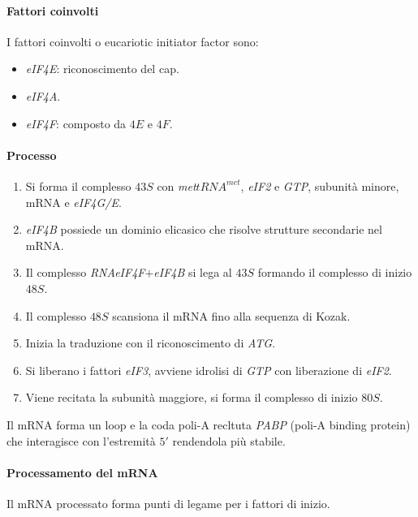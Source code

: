 			\paragraph{Fattori coinvolti}
			I fattori coinvolti o eucariotic initiator factor sono:
			\begin{multicols}{3}
				\begin{itemize}
					\item \emph{eIF4E}: riconoscimento del cap.
					\item \emph{eIF4A}.
					\item \emph{eIF4F}: composto da $4E$ e $4F$.
				\end{itemize}
			\end{multicols}

			\paragraph{Processo}
			\begin{multicols}{2}
				\begin{enumerate}
					\item Si forma il complesso $43S$ con \emph{met$tRNA^{met}$}, \emph{eIF2} e \emph{GTP}, subunit\`a minore, mRNA e \emph{eIF4G/E}.
					\item \emph{eIF4B} possiede un dominio elicasico che risolve strutture secondarie nel mRNA.
					\item Il complesso \emph{RNAeIF4F$+$eIF4B} si lega al $43S$ formando il complesso di inizio $48S$.
					\item Il complesso $48S$ scansiona il mRNA fino alla sequenza di Kozak.
					\item Inizia la traduzione con il riconoscimento di \emph{ATG}.
					\item Si liberano i fattori \emph{eIF3}, avviene idrolisi di \emph{GTP} con liberazione di \emph{eIF2}.
					\item Viene recitata la subunit\`a maggiore, si forma il complesso di inizio $80S$.
				\end{enumerate}
			\end{multicols}
			Il mRNA forma un loop e la coda poli-A recltuta \emph{PABP} (poli-A binding protein) che interagisce con l'estremit\`a $5'$ rendendola pi\`u stabile.

			\paragraph{Processamento del mRNA}
			Il mRNA processato forma punti di legame per i fattori di inizio.

